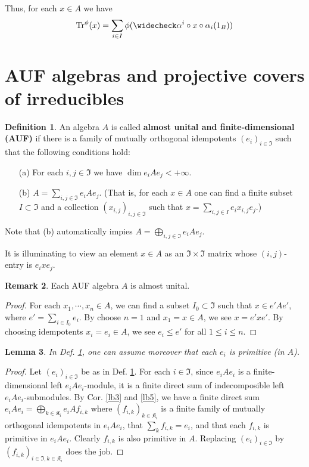 \documentclass[11pt,b5paper,notitlepage]{article}
\theoremstyle{definition}
\newtheorem{df}{Definition}[section]
\newtheorem{rem}[df]{Remark}
\theoremstyle{plain}
\newtheorem{lm}[df]{Lemma}
\newcommand{\fk}{\mathfrak}
\newcommand{\wch}{\widecheck}
\newcommand{\Tr}{\mathrm{Tr}}
\numberwithin{equation}{section}
\begin{document}
Thus, for each $x\in A$ we have
\begin{align}\label{eq7}
\Tr^\phi(x)=\sum_{i\in I}\phi(\wch\alpha^i\circ x\circ\alpha_i(1_B))
\end{align}




\section{AUF algebras and projective covers of irreducibles}



\begin{df}\label{lb4}
An algebra $A$ is called \textbf{almost unital and finite-dimensional (AUF)} if there is a family of mutually orthogonal idempotents $(e_i)_{i\in\fk I}$ such that the following conditions hold:
\begin{itemize}
\item[(a)] For each $i,j\in\fk I$ we have $\dim e_iAe_j<+\infty$.
\item[(b)] $A=\sum_{i,j\in \fk I}e_iAe_j$. (That is, for each $x\in A$ one can find a finite subset $I\subset \fk I$ and a collection $(x_{i,j})_{i,j\in\fk I}$ such that $x=\sum_{i,j\in I}e_ix_{i,j}e_j$.) 
\end{itemize}
Note that (b) automatically impies $A=\bigoplus_{i,j\in \fk I}e_iAe_j$.
\end{df}

It is illuminating to view an element $x\in A$ as an $\fk I\times \fk I$ matrix whose $(i,j)$-entry is $e_ixe_j$.

\begin{rem}\label{lb48}
	Each AUF algebra $A$ is almost unital. 
\end{rem}
\begin{proof}
	For each $x_1,\cdots,x_n\in A$, we can find a subset $I_0\subset \fk I$ such that $x\in e'Ae'$, where $e'=\sum_{i\in I_0}e_i$. By choose $n=1$ and $x_1=x\in A$, we see $x=e'xe'$. By choosing idempotents $x_i=e_i\in A$, we see $e_i\leq e'$ for all $1\leq i\leq n$.
\end{proof}







\begin{lm}\label{lb12}
In Def. \ref{lb4}, one can assume moreover that each $e_i$ is primitive (in $A$).
\end{lm}


\begin{proof}
Let $(e_i)_{i\in\fk I}$ be as in Def. \ref{lb4}. For each $i\in\fk I$, since $e_iAe_i$ is a finite-dimensional left $e_iAe_i$-module, it is a finite direct sum of indecomposible left $e_iAe_i$-submodules. By Cor. \ref{lb3} and \ref{lb5}, we have a finite direct sum $e_iAe_i=\bigoplus_{k\in\fk K_i} e_iAf_{i,k}$ where $(f_{i,k})_{k\in\fk K_i}$ is a finite family of mutually orthogonal idempotents in $e_iAe_i$, that $\sum_k f_{i,k}=e_i$, and that each $f_{i,k}$ is primitive in $e_iAe_i$. Clearly $f_{i,k}$ is also primitive in $A$. Replacing $(e_i)_{i\in\fk I}$ by $(f_{i,k})_{i\in\fk I,k\in\fk K_i}$ does the job.
\end{proof}
\end{document}

